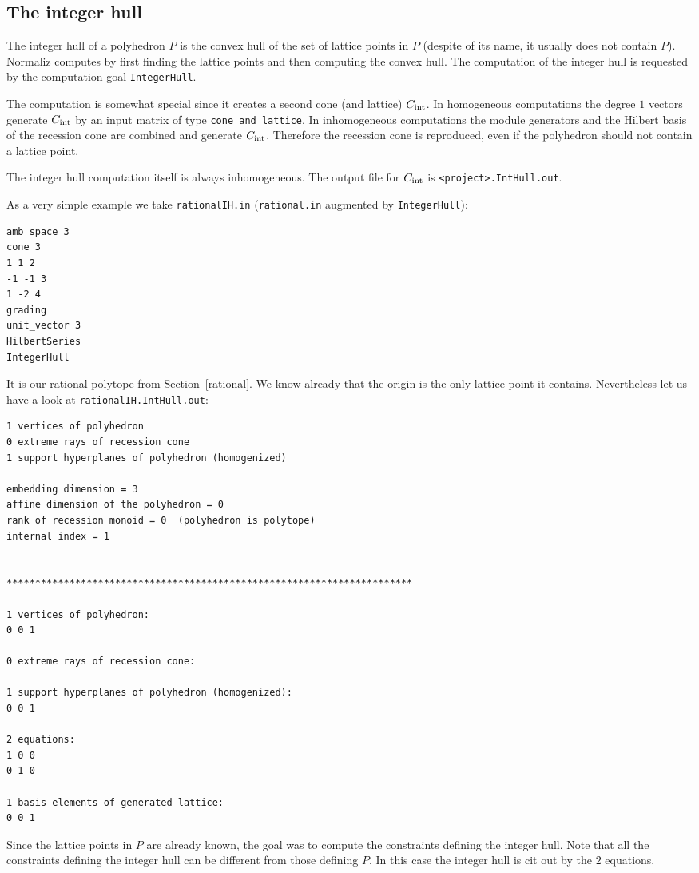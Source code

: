 \subsection{The integer hull}\label{IntHull}

The integer hull of a polyhedron $P$ is the convex hull of the set of lattice points in $P$ (despite of its name, it usually does not contain $P$). Normaliz computes by first finding the lattice points and then computing the convex hull. The computation of the integer hull is requested by the computation goal \verb|IntegerHull|.

The computation is somewhat special since it creates a second cone (and lattice) $C_\textup{int}$. In homogeneous computations the degree $1$ vectors generate $C_\textup{int}$ by an input matrix of type \verb|cone_and_lattice|. In inhomogeneous computations the module generators and the Hilbert basis of the recession cone are combined and generate $C_\textup{int}$. Therefore the recession cone is reproduced, even if the polyhedron should not contain a lattice point.

The integer hull computation itself is always inhomogeneous. The output file for $C_\textup{int}$ is \verb|<project>.IntHull.out|.

As a very simple example we take \verb|rationalIH.in| (\verb|rational.in| augmented by \verb|IntegerHull|):
\begin{Verbatim}
amb_space 3
cone 3
1 1 2
-1 -1 3
1 -2 4
grading
unit_vector 3
HilbertSeries
IntegerHull
\end{Verbatim}
It is our rational polytope from Section~\ref{rational}. We know already that the origin is the only lattice point it contains. Nevertheless let us have a look at \verb|rationalIH.IntHull.out|:

\begin{Verbatim}
1 vertices of polyhedron
0 extreme rays of recession cone
1 support hyperplanes of polyhedron (homogenized)

embedding dimension = 3
affine dimension of the polyhedron = 0
rank of recession monoid = 0  (polyhedron is polytope)
internal index = 1


***********************************************************************

1 vertices of polyhedron:
0 0 1

0 extreme rays of recession cone:

1 support hyperplanes of polyhedron (homogenized):
0 0 1

2 equations:
1 0 0
0 1 0

1 basis elements of generated lattice:
0 0 1
\end{Verbatim}
Since the lattice points in $P$ are already known, the goal was to compute the constraints defining the integer hull. Note that all the constraints defining the integer hull can be different from those defining $P$. In this case the integer hull is cit out by the $2$ equations.

